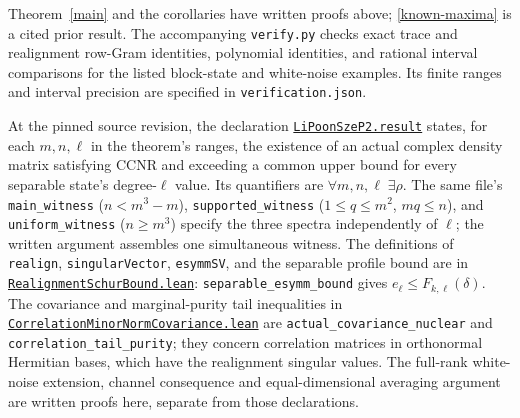 \documentclass[11pt]{article}
\newcommand{\e}{e}
\begin{document}
Theorem~\ref{main} and the corollaries have written proofs above;
\eqref{known-maxima} is a cited prior result.
The accompanying \texttt{verify.py} checks exact trace and realignment
row-Gram identities, polynomial identities, and rational interval comparisons
for the listed block-state and white-noise examples. Its finite ranges and
interval precision are specified in \texttt{verification.json}.

At the pinned source revision, the declaration
\href{https://github.com/the-omega-institute/trureturing/blob/d13f56f01c2e4710683d27a74c67cba9ec344e19/D5/S3/Quantum/Entanglement/Witness/LiPoonSzeP2.lean#L806}{\texttt{LiPoonSzeP2.result}}
states, for each $m,n,\ell$ in the theorem's ranges, the existence of an
actual complex density matrix satisfying CCNR and exceeding a common upper
bound for every separable state's degree-$\ell$ value.
Its quantifiers are $\forall m,n,\ell\;\exists\rho$.
The same file's \texttt{main\_witness} ($n<m^3-m$),
\texttt{supported\_witness} ($1\le q\le m^2$, $mq\le n$), and
\texttt{uniform\_witness} ($n\ge m^3$) specify the three spectra
independently of $\ell$; the written argument assembles one simultaneous
witness. The definitions of \texttt{realign}, \texttt{singularVector},
\texttt{esymmSV}, and the separable profile bound are in
\href{https://github.com/the-omega-institute/trureturing/blob/d13f56f01c2e4710683d27a74c67cba9ec344e19/D5/S3/Quantum/Entanglement/Witness/RealignmentSchurBound.lean#L924}{\texttt{RealignmentSchurBound.lean}}:
\texttt{separable\_esymm\_bound} gives $\e_\ell\le F_{k,\ell}(\delta)$.
The covariance and marginal-purity tail inequalities in
\href{https://github.com/the-omega-institute/trureturing/blob/d13f56f01c2e4710683d27a74c67cba9ec344e19/D5/S3/Quantum/Entanglement/Witness/CorrelationMinorNormCovariance.lean#L162}{\texttt{CorrelationMinorNormCovariance.lean}}
are \texttt{actual\_covariance\_nuclear} and
\texttt{correlation\_tail\_purity}; they concern correlation matrices
in orthonormal Hermitian bases, which have the realignment singular values.
The full-rank white-noise extension, channel consequence and
equal-dimensional averaging argument are written proofs here, separate
from those declarations.
\end{document}
